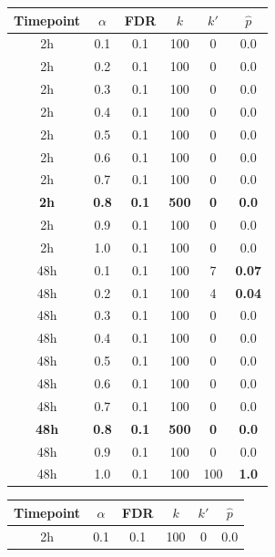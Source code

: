   \begin{center}
  \begin{table}[h]
  \centering
  \tabcolsep=0.08cm
  {%
  \begin{tabular}{| c | c | c | c | c | c |}
  \hline
  Timepoint & $\alpha$ & FDR & $k$ & $k'$ & $\hat p$ \\ \hline
  \unit{2}{h}  & 0.1 & 0.1 & 100 & 0   & 0.0   \\
  \unit{2}{h}  & 0.2 & 0.1 & 100 & 0   & 0.0   \\
  \unit{2}{h}  & 0.3 & 0.1 & 100 & 0   & 0.0   \\
  \unit{2}{h}  & 0.4 & 0.1 & 100 & 0   & 0.0   \\
  \unit{2}{h}  & 0.5 & 0.1 & 100 & 0   & 0.0   \\
  \unit{2}{h}  & 0.6 & 0.1 & 100 & 0   & 0.0   \\
  \unit{2}{h}  & 0.7 & 0.1 & 100 & 0   & 0.0   \\
  \textbf{\unit{2}{h}}  & \textbf{0.8} & \textbf{0.1} & \textbf{500} & \textbf{0}   & \textbf{0.0}   \\
  \unit{2}{h}  & 0.9 & 0.1 & 100 & 0   & 0.0   \\
  \unit{2}{h}  & 1.0 & 0.1 & 100 & 0   & 0.0   \\ \hline
  \unit{48}{h} & 0.1 & 0.1 & 100 & 7   & \textbf{0.07}  \\
  \unit{48}{h} & 0.2 & 0.1 & 100 & 4   & \textbf{0.04}  \\
  \unit{48}{h} & 0.3 & 0.1 & 100 & 0   & 0.0   \\
  \unit{48}{h} & 0.4 & 0.1 & 100 & 0   & 0.0   \\
  \unit{48}{h} & 0.5 & 0.1 & 100 & 0   & 0.0   \\
  \unit{48}{h} & 0.6 & 0.1 & 100 & 0   & 0.0   \\
  \unit{48}{h} & 0.7 & 0.1 & 100 & 0   & 0.0   \\
  \textbf{\unit{48}{h}} & \textbf{0.8} & \textbf{0.1} & \textbf{500} & \textbf{0}   & \textbf{0.0}   \\
  \unit{48}{h} & 0.9 & 0.1 & 100 & 0   & 0.0   \\
  \unit{48}{h} & 1.0 & 0.1 & 100 & 100 & \textbf{1.0} \\
   \hline
  \end{tabular}}
  \qquad
  {%
  \begin{tabular}{| c | c | c | c | c | c |}
  \hline
  Timepoint & $\alpha$ & FDR & $k$ & $k'$ & $\hat p$ \\ \hline
  \unit{2}{h}  & 0.1 & 0.1 & 100 & 0   & 0.0   \\

\end{tabular}}
\end{table}
\end{center}
